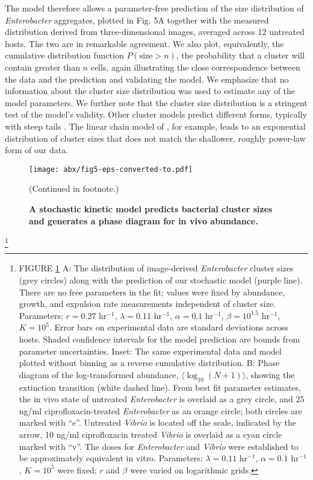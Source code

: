 The model therefore allows a parameter-free prediction of the size distribution of \textit{Enterobacter} aggregates, plotted in Fig. 5A together with the measured distribution derived from three-dimensional images, averaged across 12 untreated hosts. The two are in remarkable agreement. We also plot, equivalently, the cumulative distribution function $P(\text{size} > n)$, the probability that a cluster will contain greater than $n$ cells, again illustrating the close correspondence between the data and the prediction and validating the model. We emphasize that no information about the cluster size distribution was used to estimate any of the model parameters. We further note that the cluster size distribution is a stringent test of the model's validity. Other cluster models predict different forms, typically with steep tails \cite{krapivsky1996transitional,bansept2019enchained}. The linear chain model of \cite{bansept2019enchained}, for example, leads to an exponential distribution of cluster sizes that does not match the shallower, roughly power-law form of our data.


\begin{figure}%
\centerline{
	\texttt{[image: abx/fig5-eps-converted-to.pdf]}}
	\caption{\textbf{A stochastic kinetic model predicts bacterial cluster sizes and generates a phase diagram for in vivo abundance.}}{(Continued in footnote.)}
	\label{fig:fig5}
\end{figure}

{\let\thefootnote\relax\footnote{FIGURE \ref{fig:fig5} A: The distribution of image-derived \textit{Enterobacter} cluster sizes (grey circles) along with the prediction of our stochastic model (purple line). There are no free parameters in the fit; values were fixed by abundance, growth, and expulsion rate measurements independent of cluster size. Parameters: $r = 0.27$ hr$^{-1}$, $\lambda = 0.11$ hr$^{-1}$, $\alpha = 0.1$ hr$^{-1}$, $\beta = 10^{1.5}$ hr$^{-1}$, $K = 10^5$. Error bars on experimental data are standard deviations across hosts. Shaded confidence intervals for the model prediction are bounds from parameter uncertainties. Inset: The same experimental data and model plotted without binning as a reverse cumulative distribution. B: Phase diagram of the log-transformed abundance, $\langle \log_{10}(N+1)\rangle$, showing the extinction transition (white dashed line). From best fit parameter estimates, the in vivo state of untreated \textit{Enterobacter} is overlaid as a grey circle, and 25 ng/ml ciprofloxacin-treated \textit{Enterobacter} as an orange circle; both circles are marked with ``e''. Untreated \textit{Vibrio} is located off the scale, indicated by the arrow, 10 ng/ml ciprofloxacin treated \textit{Vibrio} is overlaid as a cyan circle marked with ``v''. The doses for \textit{Enterobacter} and \textit{Vibrio} were established to be approximately equivalent in vitro. Parameters: $\lambda = 0.11$ hr$^{-1}$, $\alpha =  0.1$ hr$^{-1}$, $K = 10^5$ were fixed; $r$ and $\beta$ were varied on logarithmic grids.}}

